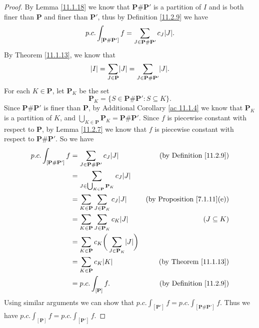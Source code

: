 \begin{proof}
    By Lemma \ref{11.1.18} we know that \(\mathbf{P} \# \mathbf{P}'\) is a partition of \(I\) and is both finer than \(\mathbf{P}\) and finer than \(\mathbf{P}'\), thus by Definition \ref{11.2.9} we have
    \[
        p.c. \int_{[\mathbf{P} \# \mathbf{P}']} f = \sum_{J \in \mathbf{P} \# \mathbf{P}'} c_J \abs*{J}.
    \]
    By Theorem \ref{11.1.13}, we know that
    \[
        \abs*{I} = \sum_{J \in \mathbf{P}} \abs*{J} = \sum_{J \in \mathbf{P} \# \mathbf{P}'} \abs*{J}.
    \]
    For each \(K \in \mathbf{P}\), let \(\mathbf{P}_K\) be the set
    \[
        \mathbf{P}_K = \{S \in \mathbf{P} \# \mathbf{P}' : S \subseteq K\}.
    \]
    Since \(\mathbf{P} \# \mathbf{P}'\) is finer than \(\mathbf{P}\), by Additional Corollary \ref{ac 11.1.4} we know that \(\mathbf{P}_K\) is a partition of \(K\), and \(\bigcup_{K \in \mathbf{P}} \mathbf{P}_K = \mathbf{P} \# \mathbf{P}'\).
    Since \(f\) is piecewise constant with respect to \(\mathbf{P}\), by Lemma \ref{11.2.7} we know that \(f\) is piecewise constant with respect to \(\mathbf{P} \# \mathbf{P}'\).
    So we have
    \begin{align*}
        p.c. \int_{[\mathbf{P} \# \mathbf{P}']} f & = \sum_{J \in \mathbf{P} \# \mathbf{P}'} c_J \abs*{J}                        & \text{(by Definition \ref{11.2.9})}     \\
                                                  & = \sum_{J \in \bigcup_{K \in \mathbf{P}} \mathbf{P}_K} c_J \abs*{J}                                                    \\
                                                  & = \sum_{K \in \mathbf{P}} \sum_{J \in \mathbf{P}_K} c_J \abs*{J}             & \text{(by Proposition \ref{7.1.11}(e))} \\
                                                  & = \sum_{K \in \mathbf{P}} \sum_{J \in \mathbf{P}_K} c_K \abs*{J}             & (J \subseteq K)                         \\
                                                  & = \sum_{K \in \mathbf{P}} c_K \bigg(\sum_{J \in \mathbf{P}_K} \abs*{J}\bigg)                                           \\
                                                  & = \sum_{K \in \mathbf{P}} c_K \abs*{K}                                       & \text{(by Theorem \ref{11.1.13})}       \\
                                                  & = p.c. \int_{[\mathbf{P}]} f.                                                & \text{(by Definition \ref{11.2.9})}
    \end{align*}
    Using similar arguments we can show that \(p.c. \int_{[\mathbf{P}']} f = p.c. \int_{[\mathbf{P} \# \mathbf{P}']} f\).
    Thus we have \(p.c. \int_{[\mathbf{P}]} f = p.c. \int_{[\mathbf{P}']} f\).
\end{proof}


